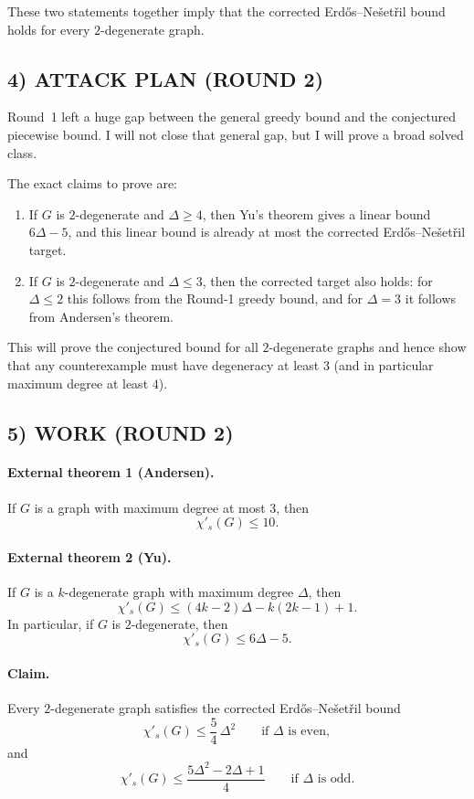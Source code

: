 These two statements together imply that the corrected Erd\H{o}s--Ne\v{s}et\v{r}il bound holds for every $2$-degenerate graph.

\subsection*{4) ATTACK PLAN (ROUND 2)}
Round~1 left a huge gap between the general greedy bound and the conjectured piecewise bound. I will not close that general gap, but I will prove a broad solved class.

The exact claims to prove are:

\begin{enumerate}
\item If $G$ is $2$-degenerate and $\Delta\ge 4$, then Yu's theorem gives a linear bound $6\Delta-5$, and this linear bound is already at most the corrected Erd\H{o}s--Ne\v{s}et\v{r}il target.
\item If $G$ is $2$-degenerate and $\Delta\le 3$, then the corrected target also holds: for $\Delta\le 2$ this follows from the Round-1 greedy bound, and for $\Delta=3$ it follows from Andersen's theorem.
\end{enumerate}

This will prove the conjectured bound for all $2$-degenerate graphs and hence show that any counterexample must have degeneracy at least $3$ (and in particular maximum degree at least $4$).

\subsection*{5) WORK (ROUND 2)}

\paragraph{External theorem 1 (Andersen).}
If $G$ is a graph with maximum degree at most $3$, then
\[
\chi'_s(G)\le 10.
\]

\paragraph{External theorem 2 (Yu).}
If $G$ is a $k$-degenerate graph with maximum degree $\Delta$, then
\[
\chi'_s(G)\le (4k-2)\Delta-k(2k-1)+1.
\]
In particular, if $G$ is $2$-degenerate, then
\[
\chi'_s(G)\le 6\Delta-5.
\]

\paragraph{Claim.}
Every $2$-degenerate graph satisfies the corrected Erd\H{o}s--Ne\v{s}et\v{r}il bound
\[
\chi'_s(G)\le \frac54\,\Delta^2 \qquad \mbox{if $\Delta$ is even},
\]
and
\[
\chi'_s(G)\le \frac{5\Delta^2-2\Delta+1}{4} \qquad \mbox{if $\Delta$ is odd}.
\]

